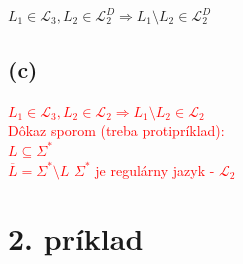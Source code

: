 \documentclass[11pt,a4paper]{article}
\newcommand{\red}[1]{\textcolor{red}{#1}}
\begin{document}
\begin{center}
$L_1 \in \mathcal{L}_3, L_2 \in \mathcal{L}_2^D \Rightarrow L_1 \setminus L_2 \in \mathcal{L}_2^D$
\end{center}


\subsection{(c)} %

\red{
$L_1 \in \mathcal{L}_3, L_2 \in \mathcal{L}_2 \Rightarrow L_1 \setminus L_2 \in \mathcal{L}_2$\\
Dôkaz sporom (treba protipríklad):\\
$L \subseteq \Sigma^*$\\
$\overline{L} = \Sigma^* \setminus L$
$\Sigma^*$ je regulárny jazyk - $\mathcal{L}_2$
}

\newpage
\section{2. príklad} %
\end{document}
